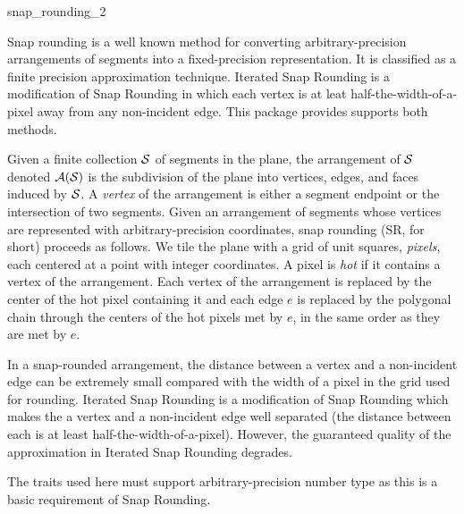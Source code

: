\begin{ccRefFunction}{snap_rounding_2}

\ccDefinition

Snap rounding is a well known method for converting
arbitrary-precision arrangements of segments into a fixed-precision
representation. It is classified as a finite precision approximation 
technique. Iterated Snap Rounding is a modification of Snap Rounding in
which each vertex is at leat half-the-width-of-a-pixel away from any
non-incident edge.
This package provides supports both methods.

Given a finite collection $\S$ of segments in the plane, the
arrangement of $\S$ denoted $\A(\S)$ is the subdivision of the plane
into vertices, edges, and faces induced by $\S$. %
A {\it vertex\/} of the arrangement is either a segment endpoint or
the intersection of two segments. Given an arrangement of segments
whose vertices are represented with arbitrary-precision coordinates,
snap rounding (SR, for short) proceeds as follows.  We tile the plane
with a grid of unit squares, {\it pixels}, each centered at a point
with integer coordinates. A pixel is {\it hot\/} if it contains a
vertex of the arrangement. Each vertex of the arrangement is replaced
by the center of the hot pixel containing it and each edge $e$ is
replaced by the polygonal chain through the centers of the hot pixels
met by $e$, in the same order as they are met by $e$.

In a snap-rounded arrangement, the distance between a vertex and
a non-incident edge can be extremely small compared with the width of a
pixel in the grid used for rounding. Iterated Snap Rounding is a modification
of Snap Rounding which makes the a vertex and a non-incident edge well separated
(the distance between each is at least half-the-width-of-a-pixel).
However, the guaranteed quality of the approximation in Iterated Snap Rounding
degrades.

The traits used here must support arbitrary-precision number type as this is a
basic requirement of Snap Rounding.




\end{ccRefFunction}
